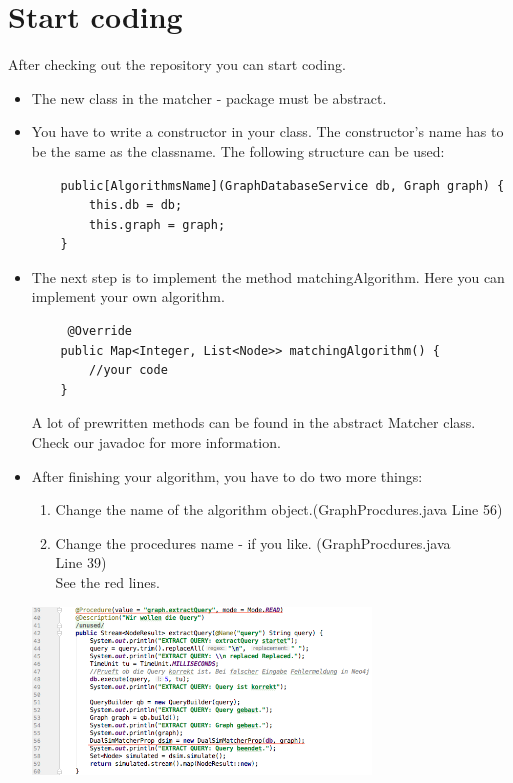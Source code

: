 \section{Start coding}\label{sec:startProgramming}
After checking out the repository you can start coding.
\begin{itemize}
	\item The new class in the \glqq matcher - package \grqq{} must be abstract.
	\item You have to write a constructor in your class. The constructor's name has to be the same as the classname. The following structure can be used: \\ %
	\lstset{language=Java}
	\begin{lstlisting}
	public[AlgorithmsName](GraphDatabaseService db, Graph graph) {
		this.db = db;
		this.graph = graph;
	}
	\end{lstlisting}
	\item The next step is to implement the method \glqq matchingAlgorithm\grqq{}. Here you can implement your own algorithm. \\
	\lstset{language=Java}
	\begin{lstlisting} 
	 @Override
	public Map<Integer, List<Node>> matchingAlgorithm() {
		//your code
	}
	\end{lstlisting} 
	A lot of prewritten methods can be found in the abstract \glqq Matcher\grqq{} class. Check our javadoc for more information.
	\item After finishing your algorithm, you have to do two more things: \\ 
	\begin{enumerate}
		\item Change the name of the algorithm object.(GraphProcdures.java Line 56) \\
		\item Change the procedures name - if you like. (GraphProcdures.java \\
		Line 39) \\
	See the red lines.
	\end{enumerate}
	\begin{center}
		\includegraphics[width=9.0cm]{common/ChangeProcedures.png}\setlength{\unitlength}{1mm}
	\end{center}
\end{itemize}

